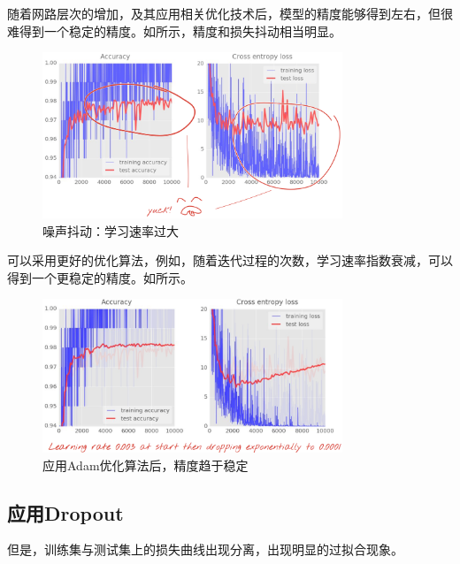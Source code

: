 \begin{content}
随着网路层次的增加，及其应用相关优化技术后，模型的精度能够得到左右，但很难得到一个稳定的精度。如所示，精度和损失抖动相当明显。

\begin{figure}[H]
\centering
\includegraphics[width=0.8\textwidth]{figures/mnist-lr-too-larger.png}
\caption{噪声抖动：学习速率过大}
 \label{fig:mnist-lr-too-larger}
\end{figure}

可以采用更好的优化算法，例如，随着迭代过程的次数，学习速率指数衰减，可以得到一个更稳定的精度。如所示。

\begin{figure}[H]
\centering
\includegraphics[width=0.8\textwidth]{figures/mnist-apply-learning-rate-decay.png}
\caption{应用Adam优化算法后，精度趋于稳定}
 \label{fig:mnist-apply-learning-rate-decay.png}
\end{figure}

\subsection{应用Dropout}

但是，训练集与测试集上的损失曲线出现分离，出现明显的过拟合现象。


\end{content}
